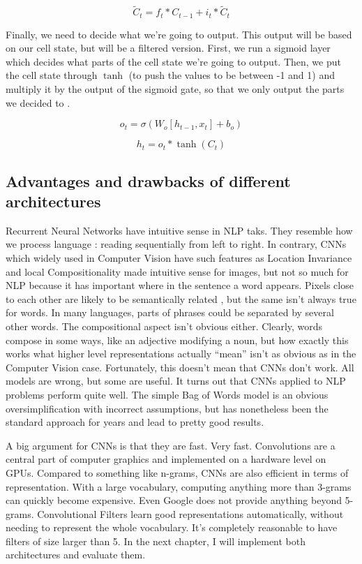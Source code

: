\begin{equation}
\tilde{C}_t = f_t*{C}_{t-1} + i_t*\tilde{C}_t
\end{equation}

Finally, we need to decide what we’re going to output. This output will be based on our cell state, but will be a filtered version. First, we run a sigmoid layer which decides what parts of the cell state we’re going to output. Then, we put the cell state through $\tanh$ (to push the values to be between -1 and 1) and multiply it by the output of the sigmoid gate, so that we only output the parts we decided to \cite{colah_lstm} .

\begin{equation}
o_t = \sigma(W_o[h_{t-1}, x_t] + b_o)
\end{equation}

\begin{equation}
h_t = o_t * \tanh(C_t)
\end{equation}

\subsection{Advantages and drawbacks of different architectures} 

Recurrent Neural Networks have intuitive sense in NLP taks. They resemble how we process language : reading sequentially from left to right. 
In contrary, CNNs which widely used in Computer Vision have such features as Location Invariance and local Compositionality made intuitive sense for images, but not so much for NLP because it has important where in the sentence a word appears. Pixels close to each other are likely to be semantically related , but the same isn’t always true for words.  In many languages, parts of phrases could be separated by several other words. The compositional aspect isn’t obvious either. Clearly, words compose in some ways, like an adjective modifying a noun, but how exactly this works what higher level representations actually “mean” isn’t as obvious as in the Computer Vision case. Fortunately, this doesn’t mean that CNNs don’t work.  All models are wrong, but some are useful. It turns out that CNNs applied to NLP problems perform quite well. The simple Bag of Words model is an obvious oversimplification with incorrect assumptions, but has nonetheless been the standard approach for years and lead to pretty good results.

A big argument for CNNs is that they are fast. Very fast. Convolutions are a central part of computer graphics and implemented on a hardware level on GPUs. Compared to something like n-grams, CNNs are also efficient in terms of representation. With a large vocabulary, computing anything more than 3-grams can quickly become expensive. Even Google does not provide anything beyond 5-grams. Convolutional Filters learn good representations automatically, without needing to represent the whole vocabulary. It’s completely reasonable to have filters of size larger than 5.\cite{wildml}
In the next chapter, I will implement both architectures and evaluate them.

